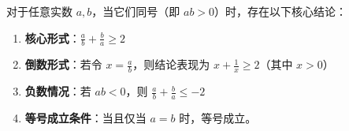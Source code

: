 \begin{statementbox}
对于任意实数 $a, b$，当它们同号（即 $ab > 0$）时，存在以下核心结论：
\begin{enumerate}
    \item \textbf{核心形式}：$\frac{a}{b} + \frac{b}{a} \geqslant 2$
    \item \textbf{倒数形式}：若令 $x = \frac{a}{b}$，则结论表现为 $x + \frac{1}{x} \geqslant 2$（其中 $x > 0$）
    \item \textbf{负数情况}：若 $ab < 0$，则 $\frac{a}{b} + \frac{b}{a} \leqslant -2$
    \item \textbf{等号成立条件}：当且仅当 $a = b$ 时，等号成立。
\end{enumerate}
\end{statementbox}